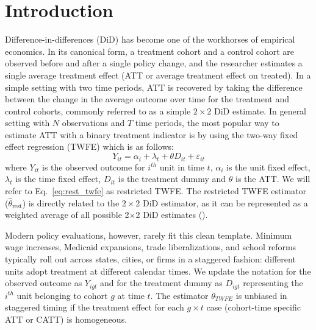 \documentclass[margin=3in, 12pt]{article}
\newcommand{\1}{\mathbbm{1}}
\begin{document}
\section{Introduction}
\label{sec:intro}

Difference-in-differences (DiD) has become one of the workhorses of empirical economics. In its canonical form, a treatment cohort and a control cohort are observed before and after a single policy change, and the researcher estimates a single average treatment effect (ATT or average treatment effect on treated). In a simple setting with two time periods, ATT is recovered by taking the difference between the change in the average outcome over time for the treatment and control cohorts, commonly referred to as a simple $2\times2$ DiD estimate. In general setting with $N$ observations and $T$ time periods, the most popular way to estimate ATT with a binary treatment indicator is by using the two-way fixed effect regression (TWFE) which is as follows:
\begin{equation}
\label{eq:rest_twfe}
  Y_{it} = \alpha_i + \lambda_t + \theta D_{it} + \varepsilon_{it}
\end{equation}
where $Y_{it}$ is the observed outcome for $i^{th}$ unit in time $t$, $\alpha_i$ is the unit fixed effect, $\lambda_t$ is the time fixed effect, $D_{it}$ is the treatment dummy and $\theta$ is the ATT. We will refer to Eq.~\ref{eq:rest_twfe} as restricted TWFE. The restricted TWFE estimator ($\hat\theta_{\text{rest}}$) is directly related to the $2\times 2$ DiD estimator, as it can be represented as a weighted average of all possible 2$\times$2 DiD estimates (\cite{goodman2021}). 


Modern policy evaluations, however, rarely fit this clean template. Minimum wage increases, Medicaid expansions, trade liberalizations, and school reforms typically roll out across states, cities, or firms in a staggered fashion: different units adopt treatment at different calendar times. We update the notation for the observed outcome as $Y_{igt}$ and for the treatment dummy as $D_{igt}$ representing the $i^{th}$ unit belonging to cohort $g$ at time $t$. The estimator $\theta_{TWFE}$ is unbiased in staggered timing if the treatment effect for each $g\times t$ case (cohort-time specific ATT or CATT) is homogeneous.
\end{document}
